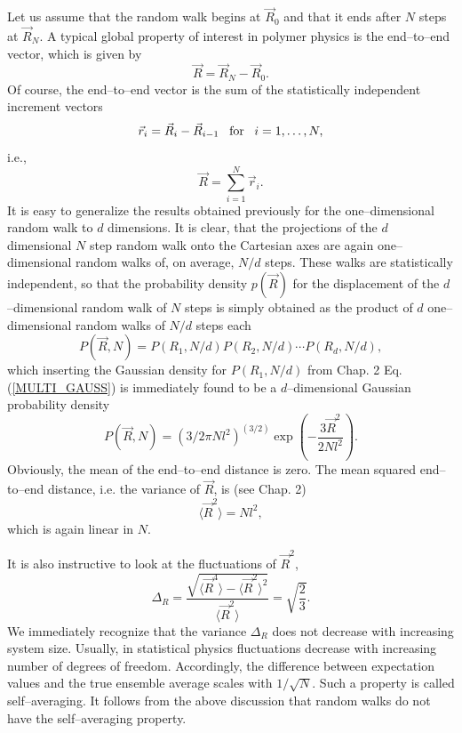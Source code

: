 Let us assume that the random walk begins at $\vec{R}_0$ and that 
it ends after $N$ steps at $\vec{R}_N$. A typical global property
of interest in polymer physics is the end--to--end vector,
which is given by
\begin{equation*}
\vec{R} = \vec{R}_N -\vec{R}_0.
\end{equation*}
Of course, the end--to--end vector is the sum of the statistically 
independent increment vectors
\begin{equation*}
\vec{r}_i = \vec{R}_i - \vec{R}_{i-1} \;\;\; {\rm for} \;\;\; 
       i=1, \ldots, N,
\end{equation*}
i.e.,
\begin{equation*}
\vec{R} = \sum_{i=1}^N \vec{r}_i.
\end{equation*}
It is easy to generalize the results obtained previously for the 
one--dimensional random walk to $d$ dimensions. It is clear, that 
the projections of the $d$ dimensional $N$ step random walk onto 
the Cartesian axes are again one--dimensional random walks of, on 
average, $N/d$ steps. These walks are statistically independent, 
so that the probability density $p(\vec{R})$ for the displacement
of the $d$--dimensional random walk of $N$ steps is simply 
obtained as the product of $d$ one--dimensional random walks of $N/d$
steps each
\begin{equation*}
P(\vec{R},N) = P(R_1,N/d) P(R_2,N/d) \cdots P(R_d,N/d),
\end{equation*}
which inserting the Gaussian density for $P(R_1,N/d)$ from Chap. 2 Eq. 
(\ref{MULTI_GAUSS}) is immediately found to be a $d$--dimensional Gaussian 
probability density
\begin{equation*}
P(\vec{R},N) = \left(3/2 \pi Nl^2 \right)^{(3/2)} 
              \exp\left( - \frac{3\vec{R}^2}{2Nl^2}\right).
\end{equation*}
Obviously, the mean of the end--to--end distance is zero. The mean
squared end--to--end distance, i.e. the variance of $\vec{R}$, 
is (see Chap. 2) 
\begin{equation}
\label{RW_R2}
\langle \vec{R}^2 \rangle = N l^2,
\end{equation}
which is again linear in $N$.

It is also instructive to look at the fluctuations of $\vec{R}^2$,
\begin{equation*}
\Delta_R = \frac{\sqrt{\langle \vec{R}^4 \rangle - 
                   \langle \vec{R}^2\rangle^2}}
             {\langle \vec{R}^2\rangle}
             = \sqrt{\frac{2}{3}}.
\end{equation*}
We immediately recognize that the variance $\Delta_R$ does not 
decrease with increasing system size. Usually, in statistical physics
fluctuations decrease with increasing number of degrees of freedom.
Accordingly, the difference between expectation values and the 
true ensemble average
scales with $1/\sqrt{N}$. Such a property is called
self--averaging. It follows from the above discussion that  
random walks do not have the self--averaging property.

